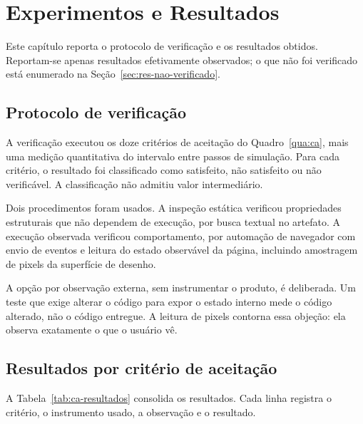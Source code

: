 
\chapter{Experimentos e Resultados}
\label{cap:resultados}

Este capítulo reporta o protocolo de verificação e os resultados obtidos.
Reportam-se apenas resultados efetivamente observados; o que não foi verificado
está enumerado na Seção~\ref{sec:res-nao-verificado}.

\section{Protocolo de verificação}
\label{sec:res-protocolo}

A verificação executou os doze critérios de aceitação do Quadro~\ref{qua:ca},
mais uma medição quantitativa do intervalo entre passos de simulação. Para cada
critério, o resultado foi classificado como satisfeito, não satisfeito ou não
verificável. A classificação não admitiu valor intermediário.

Dois procedimentos foram usados. A inspeção estática verificou propriedades
estruturais que não dependem de execução, por busca textual no artefato. A
execução observada verificou comportamento, por automação de navegador com envio
de eventos e leitura do estado observável da página, incluindo amostragem de
pixels da superfície de desenho.

A opção por observação externa, sem instrumentar o produto, é deliberada. Um
teste que exige alterar o código para expor o estado interno mede o código
alterado, não o código entregue. A leitura de pixels contorna essa objeção: ela
observa exatamente o que o usuário vê.

\section{Resultados por critério de aceitação}
\label{sec:res-ca}

A Tabela~\ref{tab:ca-resultados} consolida os resultados. Cada linha registra o
critério, o instrumento usado, a observação e o resultado.

